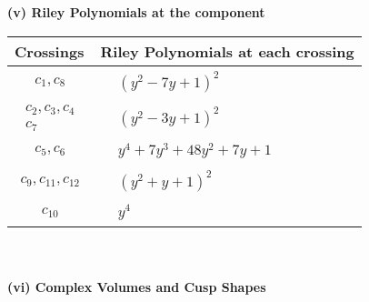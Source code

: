 \documentclass[1p]{elsarticle_modified}
\theoremstyle{definition}
\begin{document}
\newpage\renewcommand{\arraystretch}{1}
\flushleft \textbf{(v) Riley Polynomials at the component}\newline \\
\begin{tabular}{m{50pt}|m{274pt}}
Crossings & \hspace{64pt}Riley Polynomials at each crossing \\
\hline $$\begin{aligned}c_{1},c_{8}\end{aligned}$$&$\begin{aligned}
&(y^2-7 y+1)^2
\end{aligned}$\\
\hline $$\begin{aligned}c_{2},c_{3},c_{4}\\c_{7}\end{aligned}$$&$\begin{aligned}
&(y^2-3 y+1)^2
\end{aligned}$\\
\hline $$\begin{aligned}c_{5},c_{6}\end{aligned}$$&$\begin{aligned}
&y^4+7 y^3+48 y^2+7 y+1
\end{aligned}$\\
\hline $$\begin{aligned}c_{9},c_{11},c_{12}\end{aligned}$$&$\begin{aligned}
&(y^2+y+1)^2
\end{aligned}$\\
\hline $$\begin{aligned}c_{10}\end{aligned}$$&$\begin{aligned}
&y^4
\end{aligned}$\\
\hline
\end{tabular}\\~\\
\newpage\flushleft \textbf{(vi) Complex Volumes and Cusp Shapes}
\end{document}
